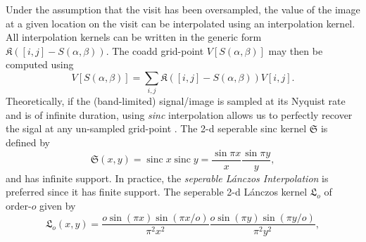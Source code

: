 \documentclass[times]{aastex6}
\DeclareMathOperator{\sinc}{sinc}
\begin{document}
Under the assumption that the visit has been oversampled, the value of the image at a given location on the visit can be interpolated using an interpolation kernel. All interpolation kernels can be written in the generic form $\mathfrak{K}([i,j] - S(\alpha,\beta))$. The coadd grid-point $V[S(\alpha, \beta)]$ may then be computed using
\begin{equation}\label{eq:GenericInterp}
  V[S(\alpha, \beta)] = \sum_{i,j}\mathfrak{K}([i,j] - S(\alpha,\beta))V[i,j].
\end{equation}
Theoretically, if the (band-limited) signal/image is sampled at its Nyquist rate and is of infinite duration, using {\it sinc} interpolation allows us to perfectly recover the sigal at any un-sampled grid-point \citep{MarksSamplingI}. The 2-d seperable sinc kernel $\mathfrak{S}$ is defined by
\begin{equation}\label{eq:SincKernel}
  \mathfrak{S}(x,y) = \sinc x \sinc y = \frac{\sin \pi x}{x} \frac{\sin \pi y}{y},
\end{equation}
and has infinite support. In practice, the {\it seperable L\'{a}nczos Interpolation} is preferred since it has finite support. The seperable 2-d L\'{a}nczos kernel $\mathfrak{L}_{o}$ of order-$o$ given by
 \begin{equation}\label{eq:LanczosKernel}
   \mathfrak{L}_{o}(x,y) = \frac{o \sin(\pi x) \sin(\pi x/o)}{\pi^{2} x^{2}} \frac{o \sin(\pi y) \sin(\pi y/o)}{\pi^{2} y^{2}},
 \end{equation}

\medskip
\end{document}
